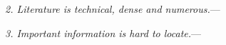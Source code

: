 \documentclass[a4paper,12pt]{article}
\renewcommand{\subsubsection}[1]{%
\vspace{2ex}
\noindent
\textit{#1.}---}
\begin{document}

\subsubsection{2. Literature is technical, dense and numerous}


\subsubsection{3. Important information is hard to locate}
\end{document}
